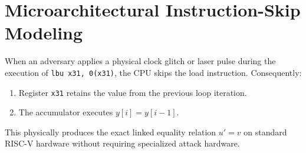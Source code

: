 \section{Microarchitectural Instruction-Skip Modeling}
\label{sec:instruction_skip}
When an adversary applies a physical clock glitch or laser pulse during the execution of \texttt{lbu x31, 0(x31)}, the CPU skips the load instruction. Consequently:
\begin{enumerate}
    \item Register \texttt{x31} retains the value from the previous loop iteration.
    \item The accumulator executes $y[i] = y[i-1]$.
\end{enumerate}
This physically produces the exact linked equality relation $u' = v$ on standard RISC-V hardware without requiring specialized attack hardware.
